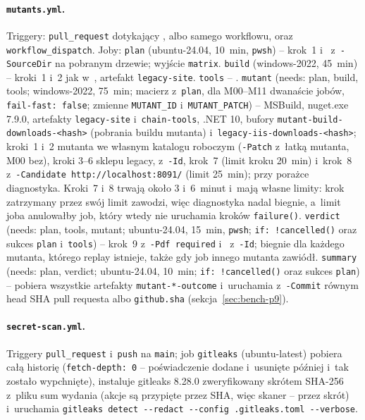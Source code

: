 \paragraph{\texttt{mutants.yml}.} Triggery: \texttt{pull\_request} dotykający
,  albo samego workflowu, oraz
\texttt{workflow\_dispatch}. Joby: \texttt{plan} (ubuntu-24.04, 10~min, \texttt{pwsh}) --
krok~1 i~ z~\texttt{-SourceDir} na pobranym drzewie; wyjście
\texttt{matrix}. \texttt{build} (windows-2022, 45~min) -- kroki~1 i~2 jak
w~, artefakt \texttt{legacy-site}. \texttt{tools} --
. \texttt{mutant} (needs: plan, build, tools; windows-2022, 75~min;
macierz z~\texttt{plan}, dla M00--M11 dwanaście jobów, \texttt{fail-fast: false}; zmienne
\texttt{MUTANT\_ID} i~\texttt{MUTANT\_PATCH}) -- MSBuild, nuget.exe 7.9.0, artefakty
\texttt{legacy-site} i~\texttt{chain-tools}, .NET 10, bufory
\texttt{mutant-build-downloads-<hash>} (pobrania buildu mutanta)
i~\texttt{legacy-iis-downloads-<hash>}; kroki~1 i~2 mutanta we własnym katalogu roboczym
(\texttt{-Patch} z~łatką mutanta, M00 bez), kroki 3--6 sklepu legacy,
 z~\texttt{-Id}, krok~7 (limit kroku 20~min) i~krok~8
z~\texttt{-Candidate http://localhost:8091/} (limit 25~min); przy porażce diagnostyka.
Kroki~7 i~8 trwają około 3 i~6~minut i~mają własne limity: krok zatrzymany przez swój limit
zawodzi, więc diagnostyka nadal biegnie, a~limit joba anulowałby job, który wtedy nie
uruchamia kroków \texttt{failure()}. \texttt{verdict} (needs: plan, tools, mutant;
ubuntu-24.04, 15~min, \texttt{pwsh}; \texttt{if: !cancelled()} oraz sukces \texttt{plan}
i~\texttt{tools}) -- krok~9 z~\texttt{-Pdf required} i~
z~\texttt{-Id}; biegnie dla każdego mutanta, którego replay istnieje, także gdy job innego
mutanta zawiódł. \texttt{summary} (needs: plan, verdict; ubuntu-24.04, 10~min;
\texttt{if: !cancelled()} oraz sukces \texttt{plan}) -- pobiera wszystkie artefakty
\texttt{mutant-*-outcome} i~uruchamia  z~\texttt{-Commit} równym
head SHA pull requesta albo \texttt{github.sha} (sekcja~\ref{sec:bench-p9}).

\paragraph{\texttt{secret-scan.yml}.} Triggery \texttt{pull\_request} i~\texttt{push} na
\texttt{main}; job \texttt{gitleaks} (ubuntu-latest) pobiera całą historię
(\texttt{fetch-depth: 0} -- poświadczenie dodane i~usunięte później i~tak zostało
wypchnięte), instaluje gitleaks 8.28.0 zweryfikowany skrótem SHA-256 z~pliku sum wydania
(akcje są przypięte przez SHA, więc skaner -- przez skrót) i~uruchamia
\texttt{gitleaks detect -{}-redact -{}-config .gitleaks.toml -{}-verbose}.

